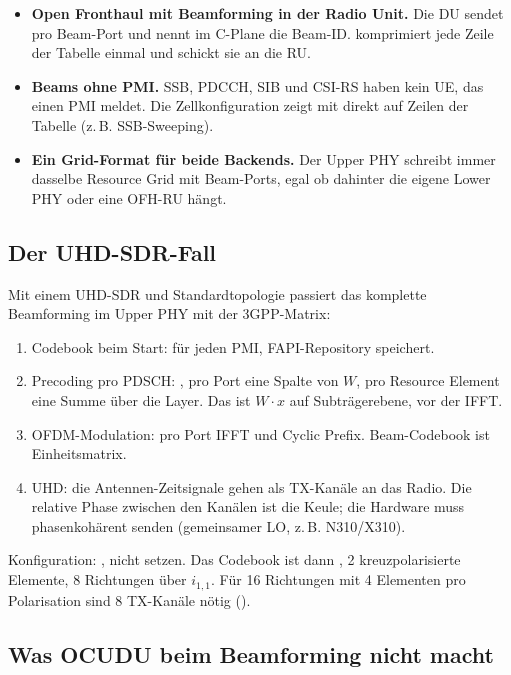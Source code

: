 \begin{itemize}
  \item \textbf{Open Fronthaul mit Beamforming in der Radio Unit.} Die DU sendet pro Beam-Port und nennt im
    C-Plane die Beam-ID.  komprimiert jede Zeile der
    Tabelle einmal und schickt sie an die RU.
  \item \textbf{Beams ohne PMI.} SSB, PDCCH, SIB und CSI-RS haben kein UE, das einen PMI meldet. Die
    Zellkonfiguration zeigt mit  direkt auf Zeilen der Tabelle (z.\,B. SSB-Sweeping).
  \item \textbf{Ein Grid-Format für beide Backends.} Der Upper PHY schreibt immer dasselbe Resource Grid mit
    Beam-Ports, egal ob dahinter die eigene Lower PHY oder eine OFH-RU hängt.
\end{itemize}

\subsection{Der UHD-SDR-Fall}

Mit einem UHD-SDR und Standardtopologie passiert das komplette Beamforming im Upper PHY mit der 3GPP-Matrix:
\begin{enumerate}
  \item Codebook beim Start:  für jeden PMI, FAPI-Repository speichert.
  \item Precoding pro PDSCH: , pro Port eine Spalte von $W$, pro Resource Element
    eine Summe über die Layer. Das ist $W\cdot x$ auf Subträgerebene, vor der IFFT.
  \item OFDM-Modulation: pro Port IFFT und Cyclic Prefix. Beam-Codebook ist Einheitsmatrix.
  \item UHD: die Antennen-Zeitsignale gehen als TX-Kanäle an das Radio. Die relative Phase zwischen den Kanälen ist
    die Keule; die Hardware muss phasenkohärent senden (gemeinsamer LO, z.\,B. N310/X310).
\end{enumerate}
Konfiguration: ,  nicht setzen. Das Codebook ist dann
, 2 kreuzpolarisierte Elemente, 8 Richtungen über $i_{1,1}$. Für 16 Richtungen mit 4 Elementen pro
Polarisation sind 8 TX-Kanäle nötig ().

\subsection{Was OCUDU beim Beamforming nicht macht}

